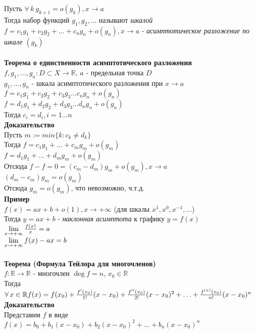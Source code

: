 \documentclass[12pt]{article}
\begin{document}
Пусть $\forall\,k\ g_{k+1}=o(g_k), x\rightarrow a$\\
Тогда набор функций $g_1,g_2,\ldots$ называют \textit{шкалой}\\
$f = c_1g_1+c_2g_2+\ldots+c_ng_n+o(g_n), x\rightarrow a$ - \textit{асимптотическое разложение по шкале $(g_k)$}\\\\
\textbf{Теорема о единственности асимптотического разложения}\\
$f,g_1,\ldots,g_n:D\subset X \rightarrow \mathbb{R}$, $a$ - предельная точка $D$\\
$g_1,\ldots,g_n$ - шкала асимптотического разложения при $x\rightarrow a$\\
$f = c_1g_1+c_2g_2+c_3g_3\ldots c_ng_n+o(g_n)$\\
$f = d_1g_1+d_2g_2+d_3g_3\ldots d_ng_n+o(g_n)$\\
Тогда $c_i = d_i, i = 1\ldots n$\\
\textbf{Доказательство}\\
Пусть $m := min\{k: c_k \neq d_k\}$\\
Тогда $f=c_1g_1+\ldots+c_mg_m+o(g_m)$\\
$f=d_1g_1+\ldots+d_mg_m+o(g_m)$\\
Отсюда $f-f=0=(c_m-d_m)g_m+o(g_m), x\rightarrow a$\\
$(d_m-c_m)g_m = o(g_m)$\\
Отсюда  $g_m = o(g_m)$, что невозможно, ч.т.д.\\
\textbf{Пример}\\
$f(x) = ax+b+o(1), x\rightarrow +\infty$ (для шкалы $x^1,x^0,x^{-1},\ldots$)\\
Тогда $y=ax+b$ - \textit{наклонная асимптота} к графику $y=f(x)$\\
$\lim\limits_{x\rightarrow+\infty}\frac{f(x)}{x} = a$\\
$\lim\limits_{x\rightarrow+\infty} f(x)-ax = b$\\\\
\textbf{Теорема (Формула Тейлора для многочленов)}\\
$f:\mathbb{R}\rightarrow\mathbb{R}$ - многочлен $\deg f = n$, $x_0\in \mathbb{R}$\\
Тогда $\forall\,x\in\mathbb{R}\\f(x)=f(x_0)+\frac{f'(x_0)}{1!}(x-x_0)+\frac{f''(x_0)}{2!}(x-x_0)^2+\ldots+\frac{f^{(n)}(x_0)}{n!}(x-x_0)^n$\\
\textbf{Доказательство}\\
Представим $f$ в виде $f(x)=b_0+b_1(x-x_0)+b_2(x-x_0)^2+\ldots+b_n(x-x_0)^n$\\
\end{document}
